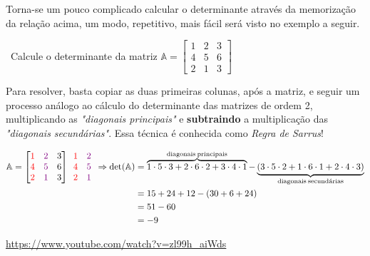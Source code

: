 Torna-se um pouco complicado calcular o determinante através da memorização da relação acima, um modo, repetitivo, mais fácil será visto no exemplo a seguir.
\begin{example}
	\video \, Calcule o determinante da matriz $\mathbb{A}=\begin{bmatrix}1 & 2 & 3\\
	4 & 5 & 6\\
	2 & 1 & 3
	\end{bmatrix}$


	Para resolver, basta copiar as duas primeiras colunas, após a matriz, e seguir um processo análogo ao cálculo do determinante das matrizes
	de ordem 2, multiplicando as \textit{"diagonais principais"} e \textbf{subtraindo} a multiplicação das \textit{"diagonais secundárias"}. Essa técnica é conhecida como \textit{Regra de Sarrus}!
	
	\begin{ceqn}
		\begin{align*}
		\mathbb{A}=\begin{bmatrix}{\color{red}1} & {\color{violet}2} & 3\\
		{\color{red}4} & {\color{violet}5} & 6\\
		{\color{red}2} & {\color{violet}1} & 3
		\end{bmatrix}\begin{array}{cc}
		{\color{red}1} & {\color{violet}2}\\
		{\color{red}4} & {\color{violet}5}\\
		{\color{red}2} & {\color{violet}1}
		\end{array}\Rightarrow\mathrm{det(\mathbb{A})} & =  \overbrace{1\cdot5\cdot3+2\cdot6\cdot2+3\cdot4\cdot1}^{\mathrm{diagonais\:principais}}-\underbrace{(3\cdot5\cdot2+1\cdot6\cdot1+2\cdot4\cdot3)}_{\mathrm{diagonais\:secund\acute{a}rias}}\\
		& =  15+24+12-(30+6+24)\\
		& =  51-60\\
		& =  -9
		\end{align*}
	\end{ceqn}
	
\doutor \url{https://www.youtube.com/watch?v=zl99h_aiWds}
\end{example}

